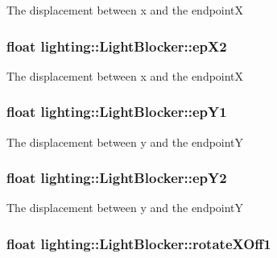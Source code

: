 The displacement between x and the endpointX 

\subsubsection[{\texorpdfstring{ep\+X2}{epX2}}]{\setlength{\rightskip}{0pt plus 5cm}float lighting\+::\+Light\+Blocker\+::ep\+X2}\hypertarget{classlighting_1_1LightBlocker_a01cf6b4663389c17b5f80294a2b26401}{}\label{classlighting_1_1LightBlocker_a01cf6b4663389c17b5f80294a2b26401}


The displacement between x and the endpointX 

\subsubsection[{\texorpdfstring{ep\+Y1}{epY1}}]{\setlength{\rightskip}{0pt plus 5cm}float lighting\+::\+Light\+Blocker\+::ep\+Y1}\hypertarget{classlighting_1_1LightBlocker_a2d8e512751df14bff73c59e3bfaea216}{}\label{classlighting_1_1LightBlocker_a2d8e512751df14bff73c59e3bfaea216}


The displacement between y and the endpointY 

\subsubsection[{\texorpdfstring{ep\+Y2}{epY2}}]{\setlength{\rightskip}{0pt plus 5cm}float lighting\+::\+Light\+Blocker\+::ep\+Y2}\hypertarget{classlighting_1_1LightBlocker_ac208ae1dafe53ec7ceab6d60113c6ca1}{}\label{classlighting_1_1LightBlocker_ac208ae1dafe53ec7ceab6d60113c6ca1}


The displacement between y and the endpointY 

\subsubsection[{\texorpdfstring{rotate\+X\+Off1}{rotateXOff1}}]{\setlength{\rightskip}{0pt plus 5cm}float lighting\+::\+Light\+Blocker\+::rotate\+X\+Off1}\hypertarget{classlighting_1_1LightBlocker_a51b85e054f0ffaf8ae51d305b62e6a6f}{}\label{classlighting_1_1LightBlocker_a51b85e054f0ffaf8ae51d305b62e6a6f}


